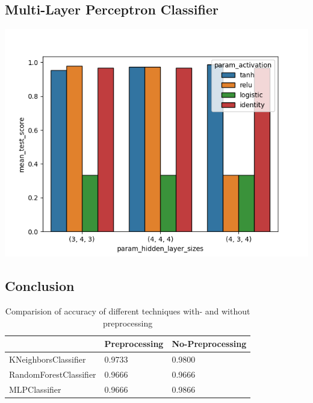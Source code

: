 \documentclass{article}
\begin{document}
\subsection{Multi-Layer Perceptron Classifier}
\includegraphics[width=\textwidth]{plots/mlp_np_comparision.png}

\subsection{Conclusion}

\begin{table}[]
\begin{center}
\begin{tabular}{|l|l|l|}
\hline
                       & Preprocessing & No-Preprocessing \\ \hline
KNeighborsClassifier   & 0.9733        & 0.9800           \\ \hline
RandomForestClassifier & 0.9666        & 0.9666           \\ \hline
MLPClassifier          & 0.9666        & 0.9866           \\ \hline
\end{tabular}
\caption{Comparision of accuracy of different techniques with- and without preprocessing}
\end{center}
\end{table}
\end{document}
